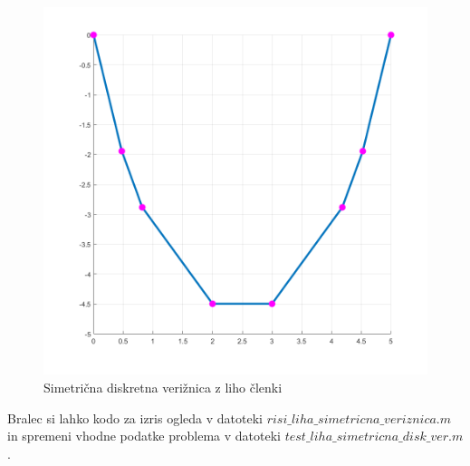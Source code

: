 \documentclass{article}
\begin{document}
\begin{figure}[H]
    \begin{center}
    \includegraphics[width=350pt]{disk_ver.png}
    \caption{Simetrična diskretna verižnica z liho členki}
    \end{center}    
\end{figure}

Bralec si lahko kodo za izris ogleda v datoteki $risi\_liha\_simetricna\_veriznica.m$ in spremeni vhodne podatke problema v datoteki $test\_liha\_simetricna\_disk\_ver.m$.

\pagebreak 
\end{document}
